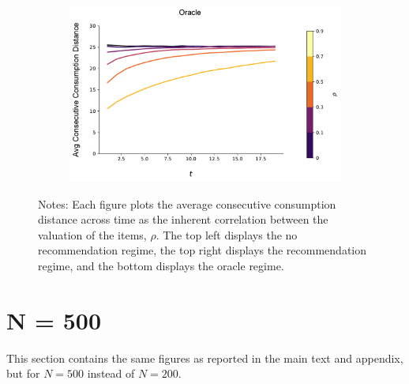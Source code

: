 \documentclass[format=acmsmall, review=true]{acmart}
\begin{document}
\begin{figure}[H]
\begin{subfigure}{.45\textwidth}
\end{subfigure}\\
\begin{subfigure}{.45\textwidth}
\includegraphics[width=\linewidth]{figures/rho_consumption_dist_N_100T_20_omni.pdf}\\
\end{subfigure}
\caption*{\scriptsize Notes: Each figure plots the average consecutive consumption distance across time as the inherent correlation between the valuation of the items, $\rho$. The top left displays the no recommendation regime, the top right displays the recommendation regime, and the bottom displays the oracle regime.}
\label{fig:local_consumption_across_rho}
\end{figure}

\clearpage

\section{N = 500}

This section contains the same figures as reported in the main text and appendix, but for $N = 500$ instead of $N = 200$.
\end{document}
